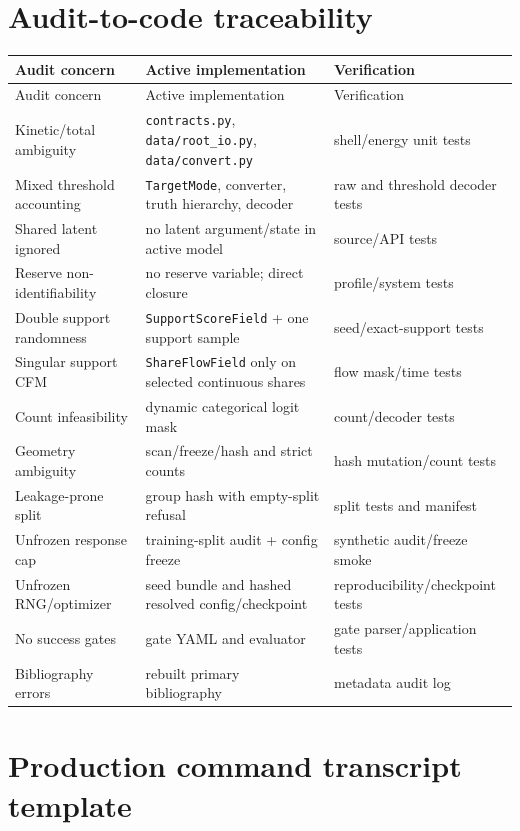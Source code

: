 \documentclass[10pt,a4paper]{article}
\begin{document}
\section{Audit-to-code traceability}

\begin{longtable}{@{}p{}p{}p{}@{}}
\toprule
Audit concern & Active implementation & Verification \\
\midrule
\endfirsthead
\toprule
Audit concern & Active implementation & Verification \\
\midrule
\endhead
Kinetic/total ambiguity & \texttt{contracts.py}, \texttt{data/root\_io.py}, \texttt{data/convert.py} & shell/energy unit tests \\
Mixed threshold accounting & \texttt{TargetMode}, converter, truth hierarchy, decoder & raw and threshold decoder tests \\
Shared latent ignored & no latent argument/state in active model & source/API tests \\
Reserve non-identifiability & no reserve variable; direct closure & profile/system tests \\
Double support randomness & \texttt{SupportScoreField} + one support sample & seed/exact-support tests \\
Singular support CFM & \texttt{ShareFlowField} only on selected continuous shares & flow mask/time tests \\
Count infeasibility & dynamic categorical logit mask & count/decoder tests \\
Geometry ambiguity & scan/freeze/hash and strict counts & hash mutation/count tests \\
Leakage-prone split & group hash with empty-split refusal & split tests and manifest \\
Unfrozen response cap & training-split audit + config freeze & synthetic audit/freeze smoke \\
Unfrozen RNG/optimizer & seed bundle and hashed resolved config/checkpoint & reproducibility/checkpoint tests \\
No success gates & gate YAML and evaluator & gate parser/application tests \\
Bibliography errors & rebuilt primary bibliography & metadata audit log \\
\bottomrule
\end{longtable}

\section{Production command transcript template}
\end{document}
